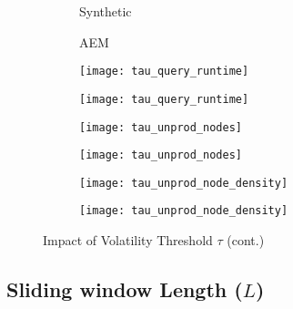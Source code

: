 \documentclass[abstracton,12pt]{scrartcl}
\theoremstyle{definition}
\begin{document}
\begin{figure}[h]\ContinuedFloat
  \centering
  \begin{subfigure}{0.49\linewidth}
    \centering
    Synthetic
  \end{subfigure}
  \begin{subfigure}{0.49\linewidth}
    \centering
    AEM
  \end{subfigure}
  \begin{subfigure}{0.49\linewidth}
    \centering
    \texttt{[image: tau\_query\_runtime]}
    \caption{}
    \label{fig:tau_query_runtime_synthetic}
  \end{subfigure}
  \begin{subfigure}{0.49\linewidth}
    \centering
    \texttt{[image: tau\_query\_runtime]}
    \caption{}
    \label{fig:tau_query_runtime_aem}
  \end{subfigure}
  \begin{subfigure}{0.49\linewidth}
    \centering
    \texttt{[image: tau\_unprod\_nodes]}
    \caption{}
    \label{fig:tau_unprod_nodes_synthetic}
  \end{subfigure}
  \begin{subfigure}{0.49\linewidth}
    \centering
    \texttt{[image: tau\_unprod\_nodes]}
    \caption{}
    \label{fig:tau_unprod_nodes_aem}
  \end{subfigure}
  \begin{subfigure}{0.49\linewidth}
    \centering
    \texttt{[image: tau\_unprod\_node\_density]}
    \caption{}
    \label{fig:tau_unprod_node_density_synthetic}
  \end{subfigure}
  \begin{subfigure}{0.49\linewidth}
    \centering
    \texttt{[image: tau\_unprod\_node\_density]}
    \caption{}
    \label{fig:tau_unprod_node_density_aem}
  \end{subfigure}
  \caption{Impact of Volatility Threshold $\tau$ (cont.)}
  \label{fig:volatility_threshold}
\end{figure}

\subsection{Sliding window Length ($L$)}
\end{document}
